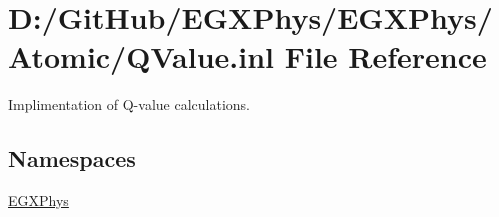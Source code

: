 \hypertarget{_q_value_8inl}{}\section{D\+:/\+Git\+Hub/\+E\+G\+X\+Phys/\+E\+G\+X\+Phys/\+Atomic/\+Q\+Value.inl File Reference}
\label{_q_value_8inl}


Implimentation of Q-\/value calculations.  


\subsection*{Namespaces}
\begin{DoxyCompactItemize}
\item 
 \mbox{\hyperlink{namespace_e_g_x_phys}{E\+G\+X\+Phys}}
\end{DoxyCompactItemize}
